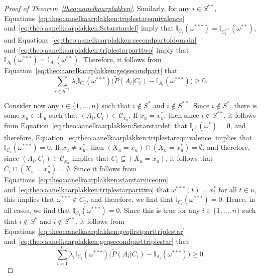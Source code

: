 \documentclass[10pt,a4paper]{paper}
\theoremstyle{definition}
\newcommand{\states}{\mathcal{X}}
\newcommand{\ind}[1]{\mathbb{I}_{#1}}
\begin{document}
\begin{proof}[Proof of Theorem~\ref{theo:aanelkaarplakken}]
Similarly, for any $i\in S^{**}$, 
Equations~\eqref{eq:theo:aanelkaarplakken:triplestarequivalence} and~\eqref{eq:theo:aanelkaarplakken:Sstarstardef} imply that $\ind{C_i}(\omega^{***})=\ind{C_i^{**}}(\omega^{**})$,
and Equations~\eqref{eq:theo:aanelkaarplakken:secondpartofdomain} and~\eqref{eq:theo:aanelkaarplakken:triplestarparttwo} imply that $\ind{A_i}(\omega^{***})=\ind{A_i}(\omega^{**})$. Therefore, it follows from Equation~\eqref{eq:theo:aanelkaarplakken:geqsecondpart} that
\begin{equation}\label{eq:theo:aanelkaarplakken:geqsecondparttriplestar}
\sum_{i\in S^{**}}\lambda_i\ind{C_i}(\omega^{***})\bigl(\tilde{P}(A_i\vert C_i)-\ind{A_i}(\omega^{***})\bigr)
\geq0.
\end{equation}

Consider now any $i\in\{1,\dots,n\}$ such that $i\notin S^*$ and $i\notin S^{**}$. Since $i\notin S^*$, there is some $x_u\in\states_u$ such that $(A_i,C_i)\in\mathcal{C}_{x_u}$. If $x_u= x_u^*$, then since $i\notin S^{**}$, it follows from Equation~\eqref{eq:theo:aanelkaarplakken:Sstarstardef} that $\ind{C_i^*}(\omega^*)=0$, and therefore, Equation~\eqref{eq:theo:aanelkaarplakken:triplestarequivalence} implies that $\ind{C_i}(\omega^{***})=0$. 
If $x_u\neq x_u^*$, then $(X_u=x_u)\cap(X_u=x_u^*)=\emptyset$, and therefore, since $(A_i,C_i)\in\mathcal{C}_{x_u}$ implies that $C_i\subseteq (X_u=x_u)$, it follows that $C_i\cap (X_u=x_u^*)=\emptyset$. Since it follows from Equations~\eqref{eq:theo:aanelkaarplakken:starstarniceonu} and~\eqref{eq:theo:aanelkaarplakken:triplestarparttwo} that $\omega^{***}(t)=x_t^*$ for all $t\in u$, this implies that $\omega^{***}\notin C_i$, and therefore, we find that $\ind{C_i}(\omega^{***})=0$.
Hence, in all cases, we find that $\ind{C_i}(\omega^{***})=0$. Since this is true for any $i\in\{1,\dots,n\}$ such that $i\notin S^*$ and $i\notin S^{**}$, it follows from Equations~\eqref{eq:theo:aanelkaarplakken:geqfirstparttriplestar} and~\eqref{eq:theo:aanelkaarplakken:geqsecondparttriplestar} that
\begin{equation}\label{eq:theo:aanelkaarplakken:geqtotal}
\sum_{i=1}^n\lambda_i\ind{C_i}(\omega^{***})\bigl(\tilde{P}(A_i\vert C_i)-\ind{A_i}(\omega^{***})\bigr)\geq0.
\end{equation}


\end{proof}
\end{document}
